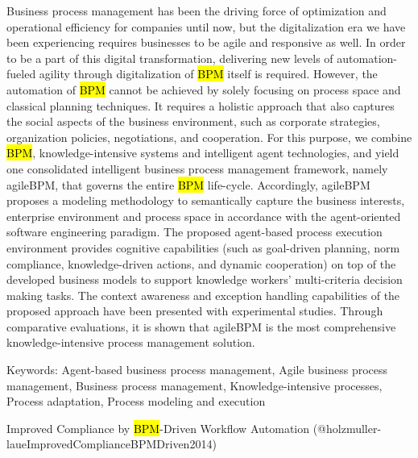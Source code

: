 \documentclass[
  letterpaper,
  DIV=11,
  numbers=noendperiod]{scrartcl}
\begin{document}
Business process management has been the driving force of optimization
and operational efficiency for companies until now, but the
digitalization era we have been experiencing requires businesses to be
agile and responsive as well. In order to be a part of this digital
transformation, delivering new levels of automation-fueled agility
through digitalization of \hl{BPM} itself is required. However, the
automation of \hl{BPM} cannot be achieved by solely focusing on process
space and classical planning techniques. It requires a holistic approach
that also captures the social aspects of the business environment, such
as corporate strategies, organization policies, negotiations, and
cooperation. For this purpose, we combine \hl{BPM}, knowledge-intensive
systems and intelligent agent technologies, and yield one consolidated
intelligent business process management framework, namely agileBPM, that
governs the entire \hl{BPM} life-cycle. Accordingly, agileBPM proposes a
modeling methodology to semantically capture the business interests,
enterprise environment and process space in accordance with the
agent-oriented software engineering paradigm. The proposed agent-based
process execution environment provides cognitive capabilities (such as
goal-driven planning, norm compliance, knowledge-driven actions, and
dynamic cooperation) on top of the developed business models to support
knowledge workers' multi-criteria decision making tasks. The context
awareness and exception handling capabilities of the proposed approach
have been presented with experimental studies. Through comparative
evaluations, it is shown that agileBPM is the most comprehensive
knowledge-intensive process management solution.

Keywords: Agent-based business process management, Agile business
process management, Business process management, Knowledge-intensive
processes, Process adaptation, Process modeling and execution

Improved Compliance by \hl{BPM}-Driven Workflow Automation
(@holzmuller-laueImprovedComplianceBPMDriven2014)
\end{document}
